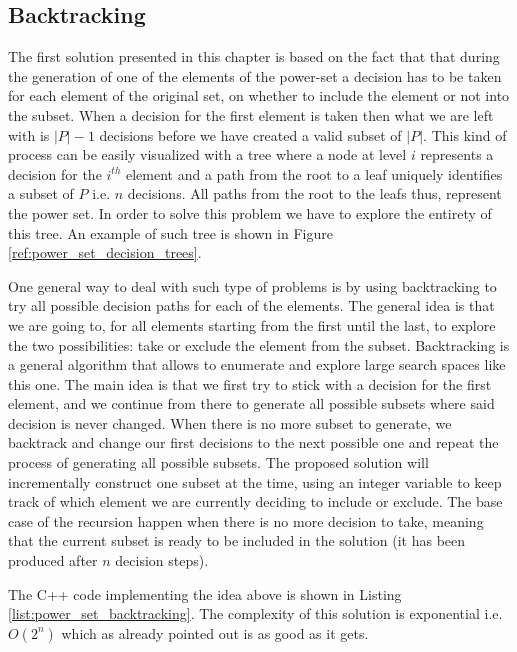 \subsection{Backtracking}
The first solution presented in this chapter is based on the fact that that during the generation of
one of the elements of the power-set a decision has to be taken for each element of the original
set, on whether to include the element or not into the subset. When a decision for the first element
is taken then what we are left with is $|P|-1$ decisions before we have created a valid subset of
$|P|$. 
This kind of process can be easily visualized with a tree where a node at level $i$
represents a decision for the $i^{th}$ element and a path from the root to a leaf uniquely
identifies a subset of $P$ i.e. $n$ decisions. 
All paths from the root to the leafs thus, represent the power set. In
order to solve this problem we have to explore the entirety of this tree. An example of such tree is
shown in Figure \ref{ref:power_set_decision_trees}.

One general way to deal with such type of problems is by using backtracking to try all possible
decision paths for each of the elements. The general idea is that we are going to, for all elements
starting from the first until the last, to explore the two possibilities: take or exclude the
element from the subset. Backtracking is a general algorithm that allows to enumerate and explore
large search spaces like this one. The main idea is that we first try to stick with a decision for
the first element, and we continue from there to generate all possible subsets where said decision
is never changed. When there is no more subset to generate, we backtrack and change our first
decisions to the next possible one and repeat the process of generating all possible subsets.
The proposed solution will incrementally construct one subset at the time, using an integer variable
to keep track of which element we are currently
deciding to include or exclude. The base case of the recursion happen when there is no more decision
to take, meaning that the current subset is ready to be included in the solution (it has been
produced after $n$ decision steps).

The C++ code implementing the idea above is shown in Listing \ref{list:power_set_backtracking}. The
complexity of this solution is exponential i.e. $O(2^n)$ which as already pointed out is as good as
it gets.

\begin{minipage}{\linewidth}
	
\end{minipage}

